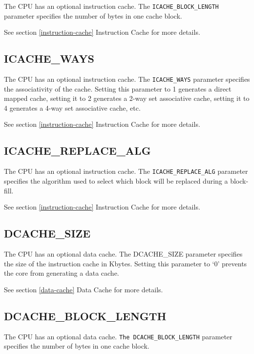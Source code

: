 The CPU has an optional instruction cache. The \texttt{ICACHE\_BLOCK\_LENGTH}
parameter specifies the number of bytes in one cache block.

See section \ref{instruction-cache} Instruction Cache for more details.

\subsection{ICACHE\_WAYS}\label{icache_ways}

The CPU has an optional instruction cache. The \texttt{ICACHE\_WAYS} parameter
specifies the associativity of the cache. Setting this parameter to 1
generates a direct mapped cache, setting it to 2 generates a 2-way set
associative cache, setting it to 4 generates a 4-way set associative
cache, etc.

See section \ref{instruction-cache} Instruction Cache for more details.

\subsection{ICACHE\_REPLACE\_ALG}\label{icache_replace_alg}

The CPU has an optional instruction cache. The \texttt{ICACHE\_REPLACE\_ALG}
parameter specifies the algorithm used to select which block will be
replaced during a block-fill.

See section \ref{instruction-cache} Instruction Cache for more details.

\subsection{DCACHE\_SIZE}\label{dcache_size}

The CPU has an optional data cache. The DCACHE\_SIZE parameter specifies
the size of the instruction cache in Kbytes. Setting this parameter to
`0' prevents the core from generating a data cache.

See section \ref{data-cache} Data Cache for more details.

\subsection{DCACHE\_BLOCK\_LENGTH}\label{dcache_block_length}

The CPU has an optional data cache. \texttt{The DCACHE\_BLOCK\_LENGTH} parameter
specifies the number of bytes in one cache block.

